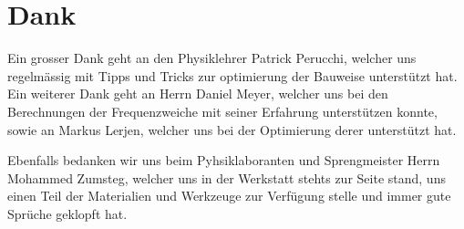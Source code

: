 \documentclass[a4paper,11pt]{report}
\begin{document}
\chapter*{Dank}
Ein grosser Dank geht an den Physiklehrer Patrick Perucchi, welcher uns regelmässig mit Tipps und Tricks zur optimierung der Bauweise unterstützt hat.
Ein weiterer Dank geht an Herrn Daniel Meyer, welcher uns bei den Berechnungen der Frequenzweiche mit seiner Erfahrung unterstützen konnte, sowie an Markus Lerjen, welcher uns bei der Optimierung derer unterstützt hat.

Ebenfalls bedanken wir uns beim Pyhsiklaboranten und Sprengmeister Herrn Mohammed Zumsteg, welcher uns in der Werkstatt stehts zur Seite stand, uns einen Teil der Materialien und Werkzeuge zur Verfügung stelle und immer gute Sprüche geklopft hat.

\newpage
\listoffigures

\newpage


\end{document}
